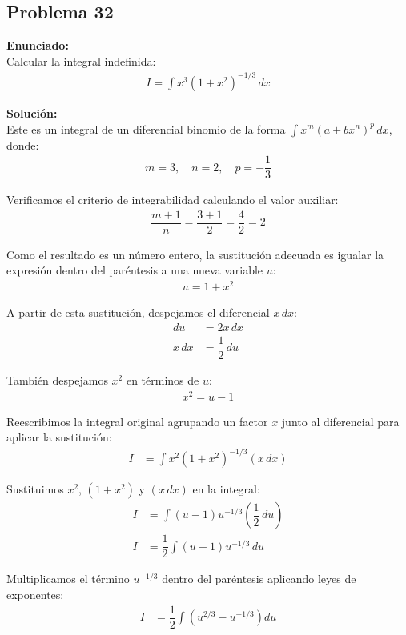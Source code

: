 \subsection*{Problema 32}

\textbf{Enunciado:} \\
Calcular la integral indefinida:
\begin{align*}
I = \int x^3 (1 + x^2)^{-1/3} \, dx
\end{align*}

\textbf{Solución:} \\
Este es un integral de un diferencial binomio de la forma $\int x^m (a + bx^n)^p \, dx$, donde:
\begin{align*}
m = 3, \quad n = 2, \quad p = -\dfrac{1}{3}
\end{align*}

Verificamos el criterio de integrabilidad calculando el valor auxiliar:
\begin{align*}
\dfrac{m + 1}{n} = \dfrac{3 + 1}{2} = \dfrac{4}{2} = 2
\end{align*}

Como el resultado es un número entero, la sustitución adecuada es igualar la expresión dentro del paréntesis a una nueva variable $u$:
\begin{align*}
u = 1 + x^2
\end{align*}

A partir de esta sustitución, despejamos el diferencial $x \, dx$:
\begin{align*}
du &= 2x \, dx \\
x \, dx &= \dfrac{1}{2} \, du
\end{align*}

También despejamos $x^2$ en términos de $u$:
\begin{align*}
x^2 = u - 1
\end{align*}

Reescribimos la integral original agrupando un factor $x$ junto al diferencial para aplicar la sustitución:
\begin{align*}
I &= \int x^2 (1 + x^2)^{-1/3} (x \, dx)
\end{align*}

Sustituimos $x^2$, $(1 + x^2)$ y $(x \, dx)$ en la integral:
\begin{align*}
I &= \int (u - 1) u^{-1/3} \left(\dfrac{1}{2} \, du\right) \\
I &= \dfrac{1}{2} \int (u - 1) u^{-1/3} \, du
\end{align*}

Multiplicamos el término $u^{-1/3}$ dentro del paréntesis aplicando leyes de exponentes:
\begin{align*}
I &= \dfrac{1}{2} \int \left( u^{2/3} - u^{-1/3} \right) du
\end{align*}

